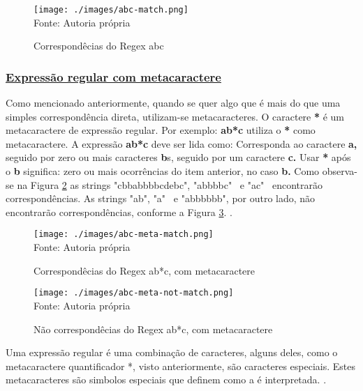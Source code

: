 \begin{figure}[H]
    \centering
    \caption{Correspondêcias do Regex abc}
    \texttt{[image: ./images/abc-match.png]}
    \label{fig:abc-match} \\
    \textnormal{\fontsize{10pt}{12pt}Fonte: Autoria própria}
\end{figure}

\subsubsection{\underline{Expressão regular com metacaractere}}

Como mencionado anteriormente, quando se quer algo que é mais do
que uma simples correspondência direta, utilizam-se metacaracteres.
O caractere
\textbf{*}
é um metacaractere de expressão regular. Por exemplo:
\textbf{ab*c}
utiliza o
\textbf{*}
como metacaractere. A expressão
\textbf{ab*c}
deve ser lida como: Corresponda ao caractere
\textbf{a,}
seguido por zero ou mais caracteres
\textbf{b}s,
seguido por um caractere
\textbf{c.}
Usar
\textbf{*}
após o
\textbf{b}
significa: zero ou mais ocorrências do item anterior, no caso
\textbf{b.}
Como observa-se na
Figura \ref{fig:abc-meta-match}
as strings "cbbabbbbcdebc", "abbbbc"~ e "ac"~
encontrarão correspondências. As strings "ab", "a"~ e "abbbbbb", por
outro lado, não encontrarão correspondências, conforme a
Figura \ref{fig:abc-meta-not-match}.
\cite{mdn-regex}.

\begin{figure}[H]
    \centering
    \caption{Correspondêcias do Regex ab*c, com metacaractere}
    \texttt{[image: ./images/abc-meta-match.png]}
    \label{fig:abc-meta-match} \\
    \textnormal{\fontsize{10pt}{12pt}Fonte: Autoria própria}
\end{figure}

\begin{figure}[H]
    \centering
    \caption{Não correspondêcias do Regex ab*c, com metacaractere}
    \texttt{[image: ./images/abc-meta-not-match.png]}
    \label{fig:abc-meta-not-match} \\
    \textnormal{\fontsize{10pt}{12pt}Fonte: Autoria própria}
\end{figure}

Uma expressão regular é uma combinação de caracteres, alguns
deles, como o metacaractere quantificador *, visto
anteriormente, são caracteres especiais. Estes metacaracteres
são simbolos especiais que definem como a é interpretada.
\cite{dp6-regex}.

